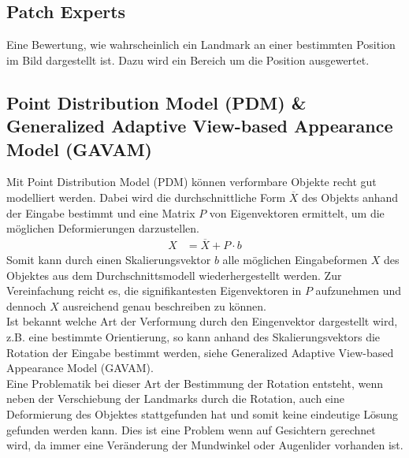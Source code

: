 \subsection{Patch Experts}
Eine Bewertung, wie wahrscheinlich ein Landmark an einer bestimmten Position im Bild dargestellt ist. Dazu wird ein Bereich um die Position ausgewertet.\\
\cite{CLNF}
\subsection{Point Distribution Model (PDM) \& Generalized Adaptive View-based Appearance Model (GAVAM)}
Mit Point Distribution Model (PDM) können verformbare Objekte recht gut modelliert werden. Dabei wird die durchschnittliche Form $\overline{X}$ des Objekts anhand der Eingabe bestimmt und eine Matrix $P$ von Eigenvektoren ermittelt, um die möglichen Deformierungen darzustellen.
\begin{align*}
X &= \overline{X}+P\cdot b
\end{align*}
Somit kann durch einen Skalierungsvektor $b$ alle möglichen Eingabeformen $X$ des Objektes aus dem Durchschnittsmodell wiederhergestellt werden. Zur Vereinfachung reicht es, die signifikantesten Eigenvektoren in $P$ aufzunehmen und dennoch $X$ ausreichend genau beschreiben zu können.\\
Ist bekannt welche Art der Verformung durch den Eingenvektor dargestellt wird, z.B. eine bestimmte Orientierung, so kann anhand des Skalierungsvektors die Rotation der Eingabe bestimmt werden, siehe Generalized Adaptive View-based Appearance Model (GAVAM).\\
Eine Problematik bei dieser Art der Bestimmung der Rotation entsteht, wenn neben der Verschiebung der Landmarks durch die Rotation, auch eine Deformierung des Objektes stattgefunden hat und somit keine eindeutige Lösung gefunden werden kann. Dies ist eine Problem wenn auf Gesichtern gerechnet wird, da immer eine Veränderung der Mundwinkel oder Augenlider vorhanden ist.\\
\cite{pdf_PDM}\cite{pdf_GAVAM}\cite{wiki_PDM}